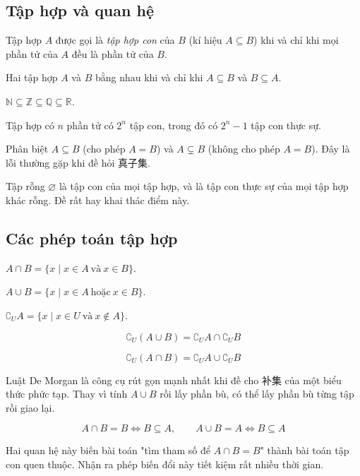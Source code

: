 \documentclass[11pt, a4paper]{article}
\begin{document}
\subsection{Tập hợp và quan hệ}

\begin{dinhnghia}
Tập hợp $A$ được gọi là \emph{tập hợp con} của $B$ (kí hiệu $A \subseteq B$) khi và chỉ khi mọi phần tử của $A$ đều là phần tử của $B$.
\end{dinhnghia}
\begin{dinhnghia}
Hai tập hợp $A$ và $B$ bằng nhau khi và chỉ khi $A \subseteq B$ và $B \subseteq A$.
\end{dinhnghia}
\begin{dinhly}
$\mathbb{N} \subseteq \mathbb{Z} \subseteq \mathbb{Q} \subseteq \mathbb{R}$.
\end{dinhly}
\begin{dinhly}
Tập hợp có $n$ phần tử có $2^n$ tập con, trong đó có $2^n - 1$ tập con thực sự.

 Phân biệt $A \subseteq B$ (cho phép $A = B$) và $A \subsetneq B$ (không cho phép $A = B$). Đây là lỗi thường gặp khi đề hỏi 真子集.

 Tập rỗng $\varnothing$ là tập con của mọi tập hợp, và là tập con thực sự của mọi tập hợp khác rỗng. Đề rất hay khai thác điểm này.
\end{dinhly}
\subsection{Các phép toán tập hợp}

\begin{dinhnghia}[{3 — Giao}]
$A \cap B = \{x \mid x \in A \ \text{và} \ x \in B\}$.
\end{dinhnghia}
\begin{dinhnghia}[{4 — Hợp}]
$A \cup B = \{x \mid x \in A \ \text{hoặc} \ x \in B\}$.
\end{dinhnghia}
\begin{dinhnghia}[{5 — Phần bù}]
$\complement_U A = \{x \mid x \in U \ \text{và} \ x \notin A\}$.
\end{dinhnghia}
\begin{dinhly}
$$\complement_U (A \cup B) = \complement_U A \cap \complement_U B$$

$$\complement_U (A \cap B) = \complement_U A \cup \complement_U B$$

 Luật De Morgan là công cụ rút gọn mạnh nhất khi đề cho 补集 của một biểu thức phức tạp. Thay vì tính $A \cup B$ rồi lấy phần bù, có thể lấy phần bù từng tập rồi giao lại.
\end{dinhly}
\begin{dinhly}
$$A \cap B = B \iff B \subseteq A, \qquad A \cup B = A \iff B \subseteq A$$

 Hai quan hệ này biến bài toán "tìm tham số để $A \cap B = B$" thành bài toán tập con quen thuộc. Nhận ra phép biến đổi này tiết kiệm rất nhiều thời gian.
\end{dinhly}
\end{document}

